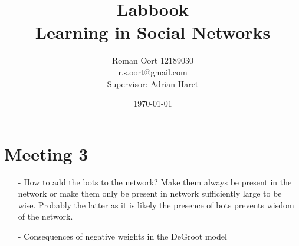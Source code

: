\documentclass{article}
\title{Labbook \\ Learning in Social Networks}
\author{Roman Oort 12189030\\ r.s.oort@gmail.com\\[1cm]{\normal Supervisor: Adrian Haret}}
\date{\today}
\begin{document}
\section{Meeting 3}
\begin{itemize}
    \item[-] How to add the bots to the network? Make them always be present in the network or make them only be present in network sufficiently large to be wise. Probably the latter as it is likely the presence of bots prevents wisdom of the network.
    \item[-] Consequences of negative weights in the DeGroot model
\end{itemize}
\end{document}
